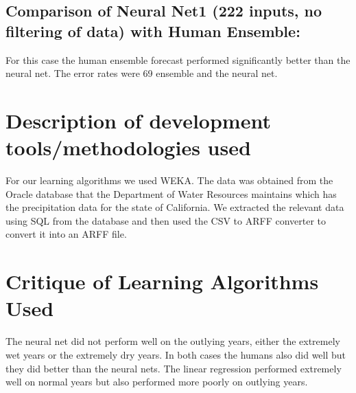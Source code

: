 \documentclass[conference]{IEEEtran}
\begin{document}
\subsection{Comparison of Neural Net1 (222 inputs, no filtering of data) with Human
Ensemble:}
For this case the human ensemble forecast performed significantly better than
the neural net. The error rates were 69%
ensemble and the neural net.

\section{Description of development tools/methodologies used}
For our learning algorithms we used WEKA. The data was obtained from the
Oracle database that the Department of Water Resources maintains which has
the precipitation data for the state of California. We extracted the relevant data
using SQL from the database and then used the CSV to ARFF converter to
convert it into an ARFF file.

\section{Critique of Learning Algorithms Used}
The neural net did not perform well on the outlying years, either the extremely
wet years or the extremely dry years. In both cases the humans also did well but
they did better than the neural nets.
The linear regression performed extremely well on normal years but also
performed more poorly on outlying years.

%
%
\end{document}
